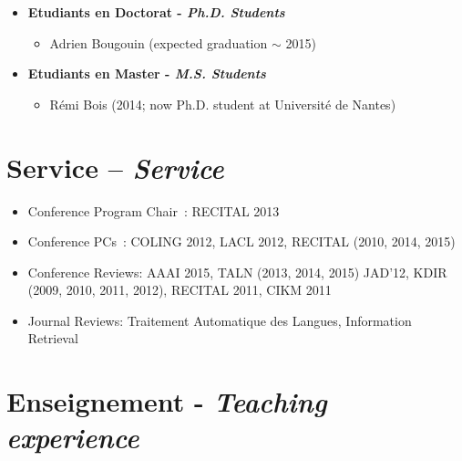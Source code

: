 \documentclass[11pt,a4paper]{moderncv}
\begin{document}
\begin{itemize}[leftmargin=0.5cm,itemsep=-0.1cm]
    \item \textbf{Etudiants en Doctorat - \textit{Ph.D. Students}}
    \vspace*{-0.3cm}
    \begin{itemize}
        \item Adrien Bougouin (expected graduation $\sim$ 2015)
    \end{itemize}
    \item \textbf{Etudiants en Master - \textit{M.S. Students}}
    \vspace*{-0.3cm}
    \begin{itemize}
        \item Rémi Bois (2014; now Ph.D. student at Université de Nantes)
    \end{itemize}
\end{itemize}

\section{Service – \textit{Service}}

\begin{itemize}[leftmargin=0.5cm,itemsep=-0.1cm]
    \item Conference Program Chair~: RECITAL 2013
    \item Conference PCs~: COLING 2012, LACL 2012, RECITAL (2010, 2014, 2015)
    \item Conference Reviews: AAAI 2015, TALN (2013, 2014, 2015) JAD'12, KDIR (2009, 2010, 2011, 2012), RECITAL 2011, CIKM 2011
    \item Journal Reviews: Traitement Automatique des Langues, Information Retrieval
\end{itemize}

\section{Enseignement - \textit{Teaching experience}}
\end{document}
